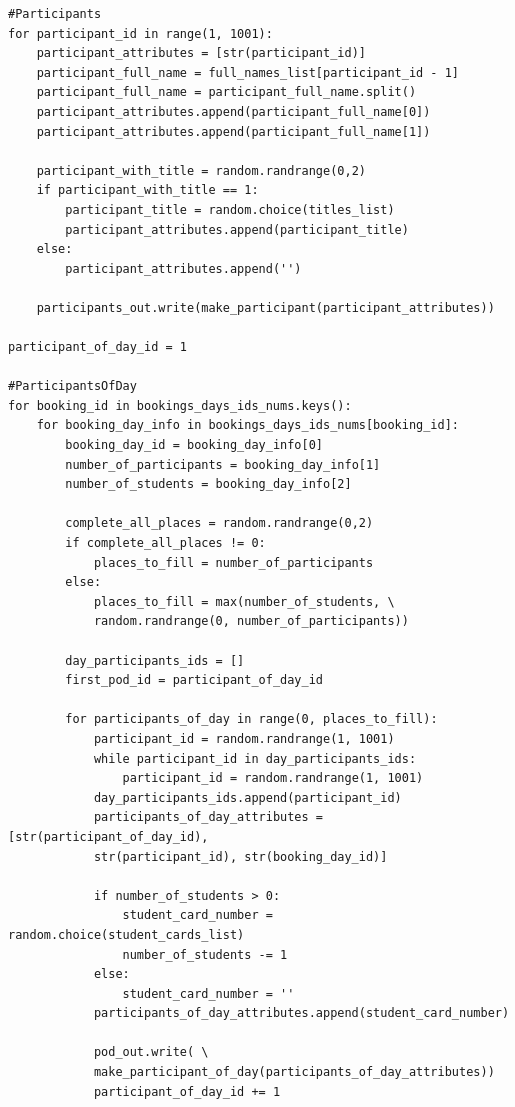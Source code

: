 \documentclass[12pt, a4paper]{mwrep}
\begin{document}
\begin{lstlisting}
#Participants
for participant_id in range(1, 1001):
    participant_attributes = [str(participant_id)]
    participant_full_name = full_names_list[participant_id - 1]
    participant_full_name = participant_full_name.split()
    participant_attributes.append(participant_full_name[0])
    participant_attributes.append(participant_full_name[1])
    
    participant_with_title = random.randrange(0,2)
    if participant_with_title == 1:
        participant_title = random.choice(titles_list)
        participant_attributes.append(participant_title)
    else:
        participant_attributes.append('')
    
    participants_out.write(make_participant(participant_attributes))

participant_of_day_id = 1
    
#ParticipantsOfDay
for booking_id in bookings_days_ids_nums.keys():
    for booking_day_info in bookings_days_ids_nums[booking_id]:
        booking_day_id = booking_day_info[0]
        number_of_participants = booking_day_info[1]
        number_of_students = booking_day_info[2]
            
        complete_all_places = random.randrange(0,2)
        if complete_all_places != 0:
            places_to_fill = number_of_participants
        else:
            places_to_fill = max(number_of_students, \
            random.randrange(0, number_of_participants))

        day_participants_ids = []
        first_pod_id = participant_of_day_id
        
        for participants_of_day in range(0, places_to_fill):
            participant_id = random.randrange(1, 1001)
            while participant_id in day_participants_ids:
                participant_id = random.randrange(1, 1001)
            day_participants_ids.append(participant_id)
            participants_of_day_attributes = [str(participant_of_day_id),
            str(participant_id), str(booking_day_id)]
            
            if number_of_students > 0:
                student_card_number = random.choice(student_cards_list)
                number_of_students -= 1
            else:
                student_card_number = ''
            participants_of_day_attributes.append(student_card_number)

            pod_out.write( \ 
            make_participant_of_day(participants_of_day_attributes))
            participant_of_day_id += 1
          

\end{lstlisting}
\end{document}
